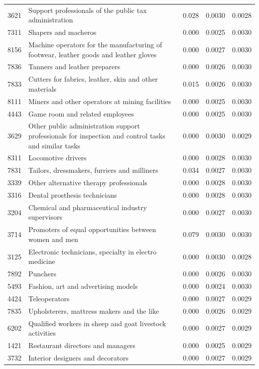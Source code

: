 \begin{longtable}{p{}>{\raggedright\arraybackslash}p{}rrr}
3621 & Support professionals of the public tax administration & 0.028 & 0.0030 & 0.0028 \\
7311 & Shapers and macheros & 0.000 & 0.0025 & 0.0030 \\
8156 & Machine operators for the manufacturing of footwear, leather goods and leather gloves & 0.000 & 0.0027 & 0.0030 \\
7836 & Tanners and leather preparers & 0.000 & 0.0026 & 0.0030 \\
7833 & Cutters for fabrics, leather, skin and other materials & 0.015 & 0.0026 & 0.0030 \\
8111 & Miners and other operators at mining facilities & 0.000 & 0.0025 & 0.0030 \\
4443 & Game room and related employees & 0.000 & 0.0025 & 0.0030 \\
3629 & Other public administration support professionals for inspection and control tasks and similar tasks & 0.000 & 0.0030 & 0.0029 \\
8311 & Locomotive drivers & 0.000 & 0.0028 & 0.0030 \\
7831 & Tailors, dressmakers, furriers and milliners & 0.034 & 0.0027 & 0.0030 \\
3339 & Other alternative therapy professionals & 0.000 & 0.0028 & 0.0030 \\
3316 & Dental prosthesis technicians & 0.000 & 0.0028 & 0.0030 \\
3204 & Chemical and pharmaceutical industry supervisors & 0.000 & 0.0027 & 0.0030 \\
3714 & Promoters of equal opportunities between women and men & 0.079 & 0.0030 & 0.0030 \\
3125 & Electronic technicians, specialty in electro medicine & 0.000 & 0.0030 & 0.0028 \\
7892 & Punchers & 0.000 & 0.0026 & 0.0030 \\
5493 & Fashion, art and advertising models & 0.000 & 0.0024 & 0.0030 \\
4424 & Teleoperators & 0.000 & 0.0027 & 0.0029 \\
7835 & Upholsterers, mattress makers and the like & 0.000 & 0.0026 & 0.0029 \\
6202 & Qualified workers in sheep and goat livestock activities & 0.000 & 0.0027 & 0.0029 \\
1421 & Restaurant directors and managers & 0.000 & 0.0025 & 0.0029 \\
3732 & Interior designers and decorators & 0.000 & 0.0027 & 0.0029 \\

\end{longtable}
